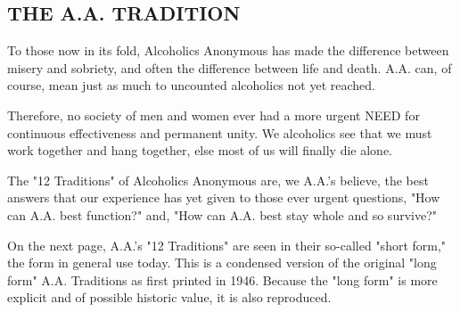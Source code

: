 
\subsection*{THE A.A. TRADITION}

\begin{biblechapter}
    To those now in its fold, 
    Alcoholics Anonymous has made the difference 
    between misery and sobriety, 
    and often the difference between life and death. 
\verse A.A. can, of course, 
    mean just as much to uncounted alcoholics not yet reached.
  
\verse Therefore, no society of men and women 
    ever had a more urgent NEED for continuous effectiveness 
    and permanent unity.
\verse We alcoholics see that we must work together and hang together, 
    else most of us will finally die alone.

\verse The "12 Traditions" of Alcoholics Anonymous are, 
    we A.A.'s believe, 
    the best answers that our experience has yet given 
    to those ever urgent questions, 
    "How can A.A. best function?" 
    and, "How can A.A. best stay whole 
    and so survive?"
  
\verse On the next page, 
    A.A.'s "12 Traditions" are seen in their so-called "short form," 
    the form in general use today.
\verse This is a condensed version of the original 
    "long form" A.A. Traditions as first printed in 1946.
\verse Because the "long form" is more explicit 
    and of possible historic value, it is also reproduced.
\end{biblechapter}

